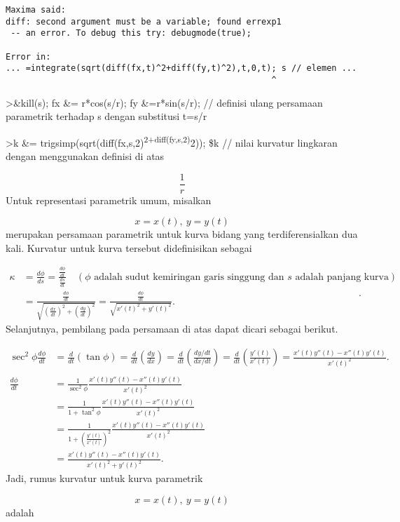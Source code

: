 \documentclass[
]{book}
\begin{document}
\begin{verbatim}
Maxima said:
diff: second argument must be a variable; found errexp1
 -- an error. To debug this try: debugmode(true);

Error in:
... =integrate(sqrt(diff(fx,t)^2+diff(fy,t)^2),t,0,t); s // elemen ...
                                                     ^
\end{verbatim}

\textgreater\&kill(s); fx \&= r*cos(s/r); fy \&=r*sin(s/r); // definisi ulang persamaan parametrik terhadap s dengan substitusi t=s/r

\textgreater k \&= trigsimp(sqrt(diff(fx,s,2)\textsuperscript{2+diff(fy,s,2)}2)); \$k // nilai kurvatur lingkaran dengan menggunakan definisi di atas

\[\frac{1}{r}\]Untuk representasi parametrik umum, misalkan

\[x = x(t),\ y= y(t)\]merupakan persamaan parametrik untuk kurva bidang yang terdiferensialkan dua kali. Kurvatur untuk kurva tersebut didefinisikan sebagai

\[\begin{aligned}\kappa &= \frac{d\phi}{ds}=\frac{\frac{d\phi}{dt}}{\frac{ds}{dt}}\quad (\phi \text{ adalah sudut kemiringan garis singgung dan }s \text{ adalah panjang kurva})\\ &=\frac{\frac{d\phi}{dt}}{\sqrt{(\frac{dx}{dt})^2+(\frac{dy}{dt})^2}}= \frac{\frac{d\phi}{dt}}{\sqrt{x'(t)^2+y'(t)^2}}.\end{aligned}.\]Selanjutnya, pembilang pada persamaan di atas dapat dicari sebagai berikut.

\[\begin{aligned}\sec^2\phi\frac{d\phi}{dt} &= \frac{d}{dt}\left(\tan\phi\right)= \frac{d}{dt}\left(\frac{dy}{dx}\right)= \frac{d}{dt}\left(\frac{dy/dt}{dx/dt}\right)= \frac{d}{dt}\left(\frac{y'(t)}{x'(t)}\right)=\frac{x'(t)y''(t)-x''(t)y'(t)}{x'(t)^2}.\\ & \\ \frac{d\phi}{dt} &= \frac{1}{\sec^2\phi}\frac{x'(t)y''(t)-x''(t)y'(t)}{x'(t)^2}\\ &= \frac{1}{1+\tan^2\phi}\frac{x'(t)y''(t)-x''(t)y'(t)}{x'(t)^2}\\ &= \frac{1}{1+\left(\frac{y'(t)}{x'(t)}\right)^2}\frac{x'(t)y''(t)-x''(t)y'(t)}{x'(t)^2}\\ &= \frac{x'(t)y''(t)-x''(t)y'(t)}{x'(t)^2+y'(t)^2}.\end{aligned}\]Jadi, rumus kurvatur untuk kurva parametrik

\[x=x(t),\ y=y(t)\]adalah
\end{document}
